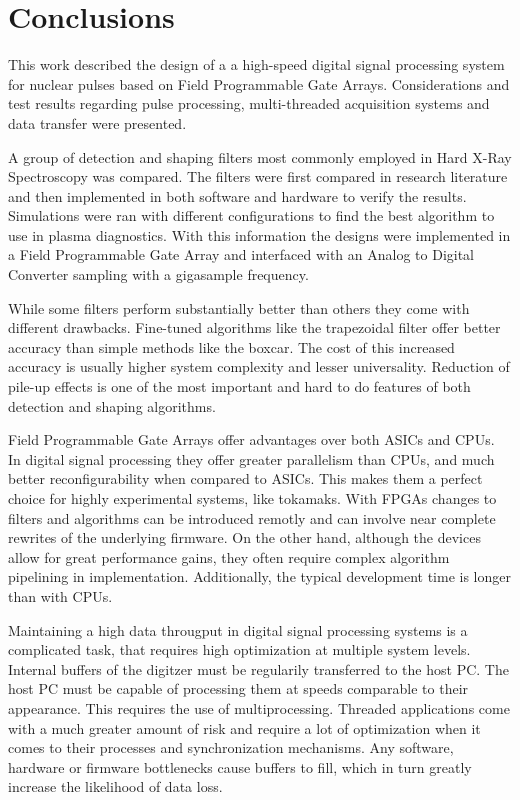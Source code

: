 \section{Conclusions}

This work described the design of a
a high-speed digital signal processing system for nuclear pulses
based on Field Programmable Gate Arrays.
Considerations and test results regarding pulse processing, 
multi-threaded acquisition systems and data transfer were presented.


A group of detection and shaping filters 
most commonly employed in Hard X-Ray Spectroscopy was compared.
The filters were first compared in research literature
and then implemented in both software and hardware to verify the results. 
Simulations were ran with different 
configurations to find the best algorithm to use in plasma diagnostics. With this
information the designs were implemented in a Field Programmable Gate Array
and interfaced with an Analog to Digital Converter sampling with a gigasample frequency.


While some filters perform substantially better than others
they come with different drawbacks. Fine-tuned algorithms like the trapezoidal filter
offer better accuracy than simple methods like the boxcar. The cost of this
increased accuracy is usually higher system complexity and lesser universality. 
Reduction of pile-up effects is one of the most important and hard to do features of 
both detection and shaping algorithms.


Field Programmable Gate Arrays offer advantages over both 
ASICs and CPUs. In digital signal processing they offer greater parallelism
than CPUs, and much better reconfigurability when compared to ASICs. 
This makes them a perfect choice for highly experimental systems, like tokamaks.
With FPGAs changes to filters and algorithms can be introduced remotly and
can involve near complete rewrites of the underlying firmware.
On the other hand, although the devices allow for great performance gains, 
they often require complex algorithm pipelining in implementation. 
Additionally, the typical development time is longer than with CPUs.


Maintaining a high data througput in digital signal processing systems
is a complicated task, that requires high optimization at multiple system levels.
Internal buffers of the digitzer must be regularily transferred to the host PC.
The host PC must be capable of processing them at speeds comparable to their appearance.
This requires the use of multiprocessing.
Threaded applications come with a much greater amount of risk and require a lot of optimization
when it comes to their processes and synchronization mechanisms.
Any software, hardware or firmware bottlenecks cause buffers to fill, 
which in turn greatly increase the likelihood of data loss.

